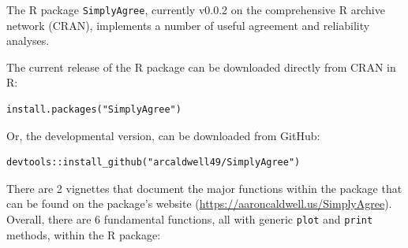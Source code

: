\documentclass[
]{article}
\begin{document}
The R package \texttt{SimplyAgree}, currently v0.0.2 on the
comprehensive R archive network (CRAN), implements a number of useful
agreement and reliability analyses.

The current release of the R package can be downloaded directly from
CRAN in R:

\begin{verbatim}
install.packages("SimplyAgree")
\end{verbatim}

Or, the developmental version, can be downloaded from GitHub:

\begin{verbatim}
devtools::install_github("arcaldwell49/SimplyAgree")
\end{verbatim}

There are 2 vignettes that document the major functions within the
package that can be found on the package's website
(\url{https://aaroncaldwell.us/SimplyAgree}). Overall, there are 6
fundamental functions, all with generic \texttt{plot} and \texttt{print}
methods, within the R package:
\end{document}
